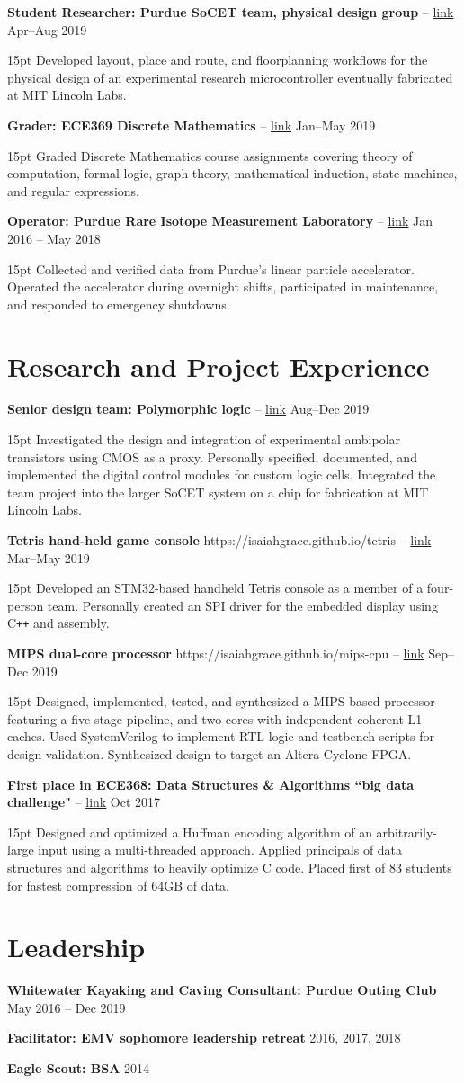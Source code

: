 \documentclass[10pt,letterpaper]{article}
\newcommand{\resumeItem}[4]{
	\begingroup
	\def\link{#2}
	\textbf{#1}
	\ifx\link\empty \else 
		-- \href{#2}{link}
	\fi
	\hfill #3\\
	\begin{adjustwidth}{15pt}{}
	#4
	\end{adjustwidth}
	\endgroup
}
\newcommand{\shortResumeItem}[2]{
	\begingroup
	\textbf{#1}
	\hfill #2\\
	\endgroup
}
\begin{document}
\resumeItem
{Student Researcher: Purdue SoCET team, physical design group}
{}
{Apr--Aug 2019}
{Developed layout, place and route, and floorplanning workflows for the physical design of an experimental research microcontroller eventually fabricated at MIT Lincoln Labs.}

\resumeItem
{Grader: ECE369 Discrete Mathematics}
{}
{Jan--May 2019}
{Graded Discrete Mathematics course assignments covering theory of computation, formal logic, graph theory, mathematical induction, state machines, and regular expressions.}

\resumeItem
{Operator: Purdue Rare Isotope Measurement Laboratory}
{}
{Jan 2016 -- May 2018}
{Collected and verified data from Purdue's linear particle accelerator. Operated the accelerator during overnight shifts, participated in maintenance, and responded to emergency shutdowns.}

\section*{Research and Project Experience}

\resumeItem
{Senior design team: Polymorphic logic}
{}
{Aug--Dec 2019}
{Investigated the design and integration of experimental ambipolar transistors using CMOS as a proxy. Personally specified, documented, and implemented the digital control modules for custom logic cells. Integrated the team project into the larger SoCET system on a chip for fabrication at MIT Lincoln Labs.}

\resumeItem
{Tetris hand-held game console}
{https://isaiahgrace.github.io/tetris}
{Mar--May 2019}
{Developed an STM32-based handheld Tetris console as a member of a four-person team. Personally created an SPI driver for the embedded display using C\texttt{++} and assembly.}

\resumeItem
{MIPS dual-core processor}
{https://isaiahgrace.github.io/mips-cpu}
{Sep--Dec 2019}
{Designed, implemented, tested, and synthesized a MIPS-based processor featuring a five stage pipeline, and two cores with independent coherent L1 caches. Used SystemVerilog to implement RTL logic and testbench scripts for design validation. Synthesized design to target an Altera Cyclone FPGA.}

\resumeItem
{First place in ECE368: Data Structures \& Algorithms ``big data challenge"}
{}
{Oct 2017}
{Designed and optimized a Huffman encoding algorithm of an arbitrarily-large input using a multi-threaded approach. Applied principals of data structures and algorithms to heavily optimize C code. Placed first of 83 students for fastest compression of 64GB of data.}

\section*{Leadership}
\shortResumeItem
{Whitewater Kayaking and Caving Consultant: Purdue Outing Club}
{May 2016 -- Dec 2019}

\shortResumeItem
{Facilitator: EMV sophomore leadership retreat}
{2016, 2017, 2018}

\shortResumeItem
{Eagle Scout: BSA}
{2014}
\end{document}
